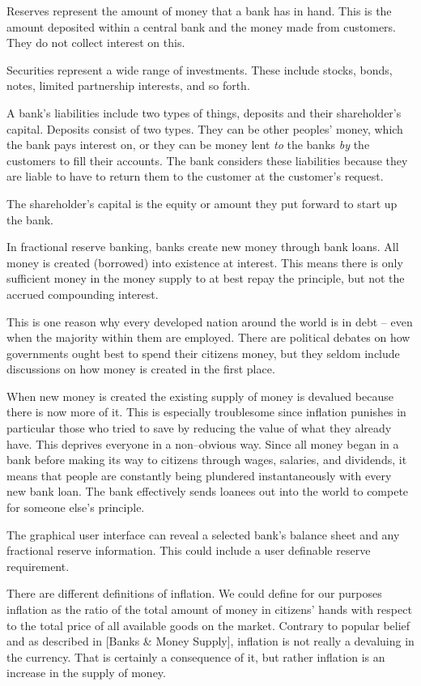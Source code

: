Reserves represent the amount of money that a bank has in hand. This is the amount deposited within a central bank and the money made from customers. They do not collect interest on this.

Securities represent a wide range of investments. These include stocks, bonds, notes, limited partnership interests, and so forth.

A bank's liabilities include two types of things, deposits and their shareholder's capital. Deposits consist of two types. They can be other peoples' money, which the bank pays interest on, or they can be money lent {\it to} the banks {\it by} the customers to fill their accounts. The bank considers these liabilities because they are liable to have to return them to the customer at the customer's request.

The shareholder's capital is the equity or amount they put forward to start up the bank.

In fractional reserve banking, banks create new money through bank loans. All money is created (borrowed) into existence at interest. This means there is only sufficient money in the money supply to at best repay the principle, but not the accrued compounding interest. 

This is one reason why every developed nation around the world is in debt -- even when the majority within them are employed. There are political debates on how governments ought best to spend their citizens money, but they seldom include discussions on how money is created in the first place.

When new money is created the existing supply of money is devalued because there is now more of it. This is especially troublesome since inflation punishes in particular those who tried to save by reducing the value of what they already have. This deprives everyone in a non--obvious way. Since all money began in a bank before making its way to citizens through wages, salaries, and dividends, it means that people are constantly being plundered instantaneously with every new bank loan. The bank effectively sends loanees out into the world to compete for someone else's principle.

The graphical user interface can reveal a selected bank's balance sheet and any fractional reserve information. This could include a user definable reserve requirement.

There are different definitions of inflation. We could define for our purposes inflation as the ratio of the total amount of money in citizens' hands with respect to the total price of all available goods on the market. Contrary to popular belief and as described in [Banks & Money Supply], inflation is not really a devaluing in the currency. That is certainly a consequence of it, but rather inflation is an increase in the supply of money.

